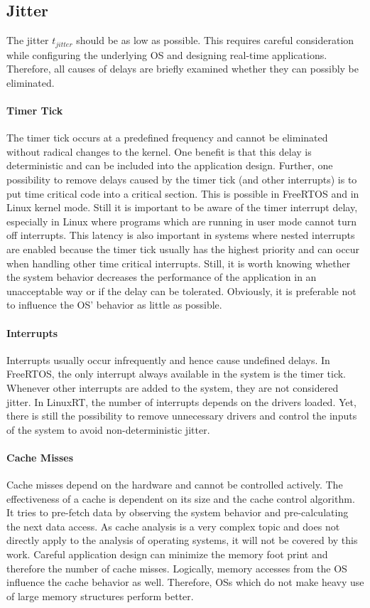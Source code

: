 \subsection{Jitter}\label{ss_jitter2}
The jitter $ t_{jitter} $ should be as low as possible. 
This requires careful consideration while configuring the underlying \ac{OS} and designing real-time applications.
Therefore, all causes of delays are briefly examined whether they can possibly be eliminated.

\paragraph{Timer Tick} 
The timer tick occurs at a predefined frequency and cannot be eliminated without radical changes to the kernel.
One benefit is that this delay is deterministic and can be included into the application design. 
Further, one possibility to remove delays caused by the timer tick (and other interrupts) is to put time critical code into a critical section.
This is possible in FreeRTOS and in Linux kernel mode.
Still it is important to be aware of the timer interrupt delay, especially in Linux where programs which are running in user mode cannot turn off interrupts. 
This latency is also important in systems where nested interrupts are enabled because the timer tick usually has the highest priority and can occur when handling other time critical interrupts. 
Still, it is worth knowing whether the system behavior decreases the performance of the application in an unacceptable way or if the delay can be tolerated.
Obviously, it is preferable not to influence the \ac{OS}' behavior as little as possible.         

\paragraph{Interrupts}
Interrupts usually occur infrequently and hence cause undefined delays. 
In FreeRTOS, the only interrupt always available in the system is the timer tick.
Whenever other interrupts are added to the system, they are not considered jitter.
In LinuxRT, the number of interrupts depends on the drivers loaded. 
Yet, there is still the possibility to remove unnecessary drivers and control the inputs of the system to avoid non-deterministic jitter.

\paragraph{Cache Misses}
Cache misses depend on the hardware and cannot be controlled actively.
The effectiveness of a cache is dependent on its size and the cache control algorithm.
It tries to pre-fetch data by observing the system behavior and pre-calculating the next data access.
As cache analysis is a very complex topic and does not directly apply to the analysis of operating systems, it will not be covered by this work.
Careful application design can minimize the memory foot print and therefore the number of cache misses.
Logically, memory accesses from the \ac{OS} influence the cache behavior as well. 
Therefore, \acp{OS} which do not make heavy use of large memory structures perform better. 

